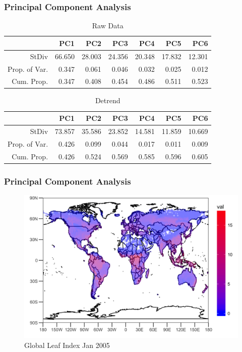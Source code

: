 \documentclass{beamer}
\begin{document}
\begin{frame}
\frametitle{Principal Component Analysis}
\begin{table}[ht]
	\centering
	\begin{tabular}{rrrrrrr}
		\hline
		& PC1 & PC2 & PC3 & PC4 & PC5 & PC6 \\ 
		\hline
		StDiv & 66.650 & 28.003 & 24.356 & 20.348 & 17.832 & 12.301 \\ 
		Prop. of Var. & 0.347 & 0.061 & 0.046 & 0.032 & 0.025 & 0.012 \\ 
		Cum. Prop.& 0.347 & 0.408 & 0.454 & 0.486 & 0.511 & 0.523 \\ 
		\hline
	\end{tabular}
\caption{Raw Data}
\end{table}
\begin{table}[ht]
	\centering
	\begin{tabular}{rrrrrrr}
		\hline
		& PC1 & PC2 & PC3 & PC4 & PC5 & PC6 \\ 
		\hline
		StDiv & 73.857 & 35.586 & 23.852 & 14.581 & 11.859 & 10.669 \\ 
		Prop. of Var. & 0.426 & 0.099 & 0.044 & 0.017 & 0.011 & 0.009 \\ 
		Cum. Prop. & 0.426 & 0.524 & 0.569 & 0.585 & 0.596 & 0.605 \\ 
		\hline
	\end{tabular}
\caption{Detrend}
\end{table}
\end{frame}

\begin{frame}
\frametitle{Principal Component Analysis}
\begin{figure}
	\centering
	\includegraphics[width=0.9\linewidth]{../img/sample_plot}
	\caption{Global Leaf Index Jan 2005}
	\label{fig:sampleplot}
\end{figure}

\end{frame}
\end{document}
